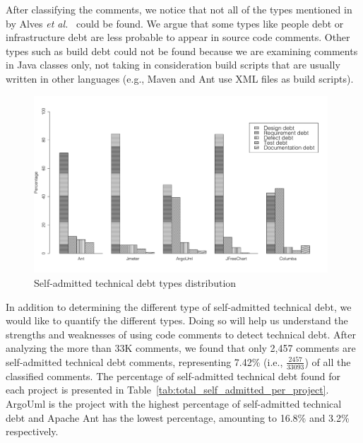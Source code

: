 After classifying the comments, we notice that not all of the types mentioned in by Alves \emph{et al.}~\cite{Alves2014MTD} could be found. We argue that some types like people debt or infrastructure debt are less probable to appear in source code comments. Other types such as build debt could not be found because we are examining comments in Java classes only, not taking in consideration build scripts that are usually written in other languages (e.g., Maven and Ant use XML files as build scripts). 



\begin{figure}[thb!]
  \centering
  \includegraphics[width=0.98\textwidth]{figures/td.pdf}
  \vspace{-8mm}
  \caption{Self-admitted technical debt types distribution}
  \label{fig:satd_distribution}
\end{figure}

In addition to determining the different type of self-admitted technical debt, we would like to quantify the different types. Doing so will help us understand the strengths and weaknesses of using code comments to detect technical debt. After analyzing the more than 33K comments, we found that only 2,457 comments are self-admitted technical debt comments, representing 7.42\% (i.e., $\frac{2457}{33093}$) of all the classified comments. The percentage of self-admitted technical debt found for each project is presented in Table~\ref{tab:total_self_admitted_per_project}. ArgoUml is the project with the highest percentage of self-admitted technical debt and Apache Ant has the lowest percentage, amounting to 16.8\% and 3.2\% respectively.

